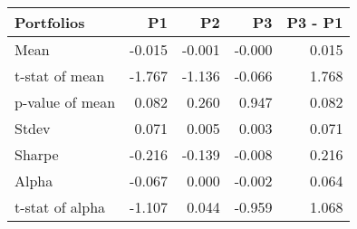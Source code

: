 \begin{tabular}{lrrrr}
\toprule
Portfolios & P1 & P2 & P3 & P3 - P1 \\
\midrule
Mean & -0.015 & -0.001 & -0.000 & 0.015 \\
t-stat of mean & -1.767 & -1.136 & -0.066 & 1.768 \\
p-value of mean & 0.082 & 0.260 & 0.947 & 0.082 \\
Stdev & 0.071 & 0.005 & 0.003 & 0.071 \\
Sharpe & -0.216 & -0.139 & -0.008 & 0.216 \\
Alpha & -0.067 & 0.000 & -0.002 & 0.064 \\
t-stat of alpha & -1.107 & 0.044 & -0.959 & 1.068 \\
\bottomrule
\end{tabular}
